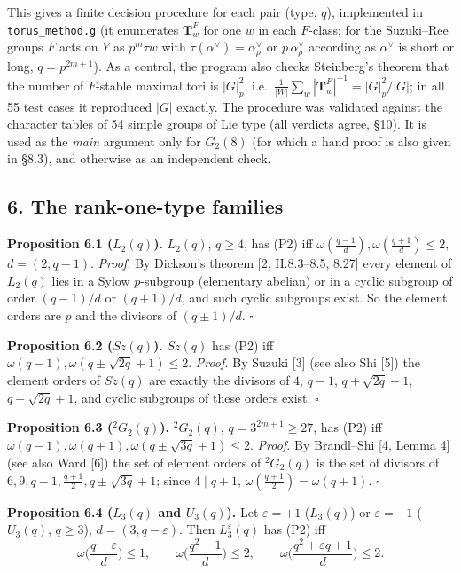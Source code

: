 \documentclass[11pt,a4paper]{article}
\begin{document}
This gives a finite decision procedure for each pair (type, \(q\)),
implemented in \texttt{torus\_method.g} (it enumerates \(\mathbf T_w^F\)
for one \(w\) in each \(F\)-class; for the Suzuki--Ree groups \(F\) acts
on \(Y\) as \(p^m\tau w\) with \(\tau(\alpha^\vee)=\alpha_\rho^\vee\) or
\(p\,\alpha_\rho^\vee\) according as \(\alpha^\vee\) is short or long,
\(q=p^{2m+1}\)). As a control, the program also checks Steinberg's
theorem that the number of \(F\)-stable maximal tori is \(|G|_p^2\),
i.e.~\(\frac{1}{|W|}\sum_{w}|\mathbf T_w^F|^{-1}=|G|_p^2/|G|\); in all
55 test cases it reproduced \(|G|\) exactly. The procedure was validated
against the character tables of 54 simple groups of Lie type (all
verdicts agree, §10). It is used as the \emph{main} argument only for
\(G_2(8)\) (for which a hand proof is also given in §8.3), and otherwise
as an independent check.

\subsection{6. The rank-one-type
families}\label{the-rank-one-type-families}

\textbf{Proposition 6.1 (\(L_2(q)\)).} \(L_2(q)\), \(q\ge4\), has (P2)
iff \(\omega(\frac{q-1}{d}),\omega(\frac{q+1}{d})\le 2\), \(d=(2,q-1)\).
\emph{Proof.} By Dickson's theorem {[}2, II.8.3--8.5, 8.27{]} every
element of \(L_2(q)\) lies in a Sylow \(p\)-subgroup (elementary
abelian) or in a cyclic subgroup of order \((q-1)/d\) or \((q+1)/d\),
and such cyclic subgroups exist. So the element orders are \(p\) and the
divisors of \((q\pm1)/d\). \(\square\)

\textbf{Proposition 6.2 (\(Sz(q)\)).} \(Sz(q)\) has (P2) iff
\(\omega(q-1),\omega(q\pm\sqrt{2q}+1)\le2\). \emph{Proof.} By Suzuki
{[}3{]} (see also Shi {[}5{]}) the element orders of \(Sz(q)\) are
exactly the divisors of \(4\), \(q-1\), \(q+\sqrt{2q}+1\),
\(q-\sqrt{2q}+1\), and cyclic subgroups of these orders exist.
\(\square\)

\textbf{Proposition 6.3 (\({}^2G_2(q)\)).} \({}^2G_2(q)\),
\(q=3^{2m+1}\ge27\), has (P2) iff
\(\omega(q-1),\omega(q+1),\omega(q\pm\sqrt{3q}+1)\le 2\). \emph{Proof.}
By Brandl--Shi {[}4, Lemma 4{]} (see also Ward {[}6{]}) the set of
element orders of \({}^2G_2(q)\) is the set of divisors of
\(6,9,q-1,\frac{q+1}{2},q\pm\sqrt{3q}+1\); since \(4\mid q+1\),
\(\omega(\frac{q+1}{2})=\omega(q+1)\). \(\square\)

\textbf{Proposition 6.4 (\(L_3(q)\) and \(U_3(q)\)).} Let
\(\varepsilon=+1\) (\(L_3(q)\)) or \(\varepsilon=-1\) (\(U_3(q)\),
\(q\ge3\)), \(d=(3,q-\varepsilon)\). Then \(L_3^\varepsilon(q)\) has
(P2) iff
\[\omega\Big(\frac{q-\varepsilon}{d}\Big)\le 1,\qquad \omega\Big(\frac{q^2-1}{d}\Big)\le 2,\qquad \omega\Big(\frac{q^2+\varepsilon q+1}{d}\Big)\le 2 .\]
\end{document}
